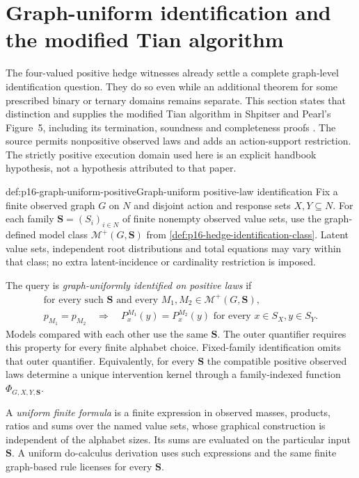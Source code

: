 \section{Graph-uniform identification and the modified Tian algorithm}
\label{sec:p16-graph-uniform-identification}

The four-valued positive hedge witnesses already settle a complete
graph-level identification question. They do so even while an additional
theorem for some prescribed binary or ternary domains remains separate.
This section states that distinction and supplies the modified Tian
algorithm in Shpitser and Pearl's Figure~5, including its termination,
soundness and completeness proofs
\cite[Figure~5, Theorems~7--8 and Corollary~5,
pp.~1225--1226]{ShpitserPearl2006JointIdentification}.
The source permits nonpositive observed laws and adds an action-support
restriction. The strictly positive execution domain used here is an
explicit handbook hypothesis, not a hypothesis attributed to that paper.

\begin{hbdefinition}{def:p16-graph-uniform-positive}{Graph-uniform positive-law identification}
Fix a finite observed graph \(G\) on \(N\) and disjoint action
and response sets \(X,Y\subseteq N\). For each family
\(\mathbf S=(S_i)_{i\in N}\) of finite nonempty observed value sets,
use the graph-defined model class \(\mathcal M^+(G,\mathbf S)\)
from \cref{def:p16-hedge-identification-class}. Latent value sets,
independent root distributions and total equations may vary within
that class; no extra latent-incidence or cardinality restriction is imposed.

The query is \emph{graph-uniformly identified on positive laws} if
\[
 \begin{gathered}
 \text{for every such }\mathbf S\text{ and every }
 M_1,M_2\in\mathcal M^+(G,\mathbf S),\\
 p_{M_1}=p_{M_2}
 \quad\Longrightarrow\quad
 P^{M_1}_x(y)=P^{M_2}_x(y)
 \text{ for every }x\in S_X, y\in S_Y.
 \end{gathered}
\]
Models compared with each other use the same \(\mathbf S\).
The outer quantifier requires this property for every finite alphabet
choice. Fixed-family identification omits that outer quantifier.
Equivalently, for every \(\mathbf S\) the compatible positive
observed laws determine a unique intervention kernel through a
family-indexed function \(\Phi_{G,X,Y,\mathbf S}\).

A \emph{uniform finite formula} is a finite expression in observed
masses, products, ratios and sums over the named value sets, whose
graphical construction is independent of the alphabet sizes. Its
sums are evaluated on the particular input \(\mathbf S\).
A uniform do-calculus derivation uses such expressions and the same
finite graph-based rule licenses for every \(\mathbf S\).
\end{hbdefinition}

